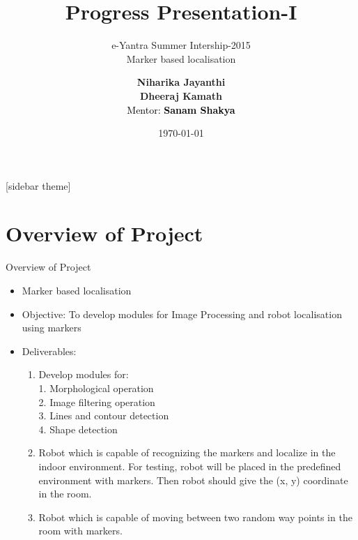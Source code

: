 \documentclass[10pt, a4paper]{beamer}
\begin{document}
	\title{Progress Presentation-I}
	\subtitle{e-Yantra Summer Intership-2015 \\ Marker based localisation }
	\author{\textbf{Niharika Jayanthi}\\ \textbf{Dheeraj Kamath}\\
	\textcolor{black}{Mentor: \textbf{Sanam Shakya}}}
	\date{\today}
	\frame{\titlepage}

[sidebar theme]
\section{Overview of Project}
\begin{frame}{Overview of Project}

	\begin{itemize}
		\pause
		\item  Marker based localisation
		\pause
		\item Objective: To develop modules for Image Processing and robot localisation using markers
		\pause
		\item Deliverables:\begin{enumerate}
			\item Develop modules for: \\
			      1. Morphological operation \\
			      2. Image filtering operation \\
			      3. Lines and contour detection \\
			      4. Shape detection
			\pause
			\item 	Robot which is capable of recognizing the markers and localize in the indoor environment. For testing, robot will be placed in the predefined environment with markers. Then robot should give the (x, y) coordinate in the room.
			\pause
			\item 	Robot which is capable of moving between two random way points in the room with markers.
		 	
		                     \end{enumerate}
	\end{itemize}
\end{frame}
\end{document}
